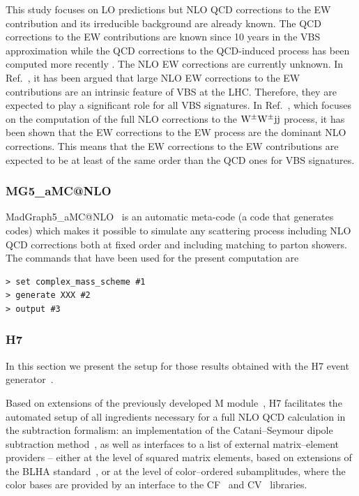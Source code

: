 \documentclass[11pt]{cernrep}
\makeatletter
\newcommand{\Herwig}{H\protect\scalebox{0.8}{ERWIG}7\xspace}
\newcommand{\Matchbox}{M\protect\scalebox{0.8}{ATCHBOX}\xspace}
\newcommand{\MGaMC}{M\protect\scalebox{0.8}{AD}G\protect\scalebox{0.8}{RAPH}5\_aMC@NLO\xspace}
\newcommand{\CVolver}{CV\protect\scalebox{0.8}{OLVER}\xspace}
\newcommand{\ColorFull}{C\protect\scalebox{0.8}{OLOR}F\protect\scalebox{0.8}{ULL}\xspace}
\newcommand{\MP}[1]{{ {\color{blue}{ [MP: #1]}} }}
\makeatother
\begin{document}
This study focuses on LO predictions but NLO QCD corrections to the EW contribution and its irreducible background are already known.
The QCD corrections to the EW contributions are known since 10 years in the VBS approximation \cite{Bozzi:2007ur} while the QCD corrections to the QCD-induced process has been computed more recently \cite{Campanario:2013qba}.
The NLO EW corrections are currently unknown.
In Ref.~\cite{Biedermann:2016yds}, it has been argued that large NLO EW corrections to the EW contributions are an intrinsic feature of VBS at the LHC.
Therefore, they are expected to play a significant role for all VBS signatures.
In Ref.~\cite{Biedermann:2017bss}, which focuses on the computation of the full NLO corrections to the ${\rm W}^\pm{\rm W}^\pm{\rm j}{\rm j}$ process, it has been shown that the EW corrections to the EW process are the dominant NLO corrections.
This means that the EW corrections to the EW contributions are expected to be at least of the same order than the QCD ones for VBS signatures.
\MP{Add some comments on parton shower effects that can play a significant role.}

\subsubsection*{\protect\MGaMC \label{vbs_mgamc}}

{\sc MadGraph5\_aMC@NLO}~\cite{Alwall:2014hca} is an automatic meta-code (a code that generates codes) which makes it possible to simulate any scattering process
      including NLO QCD corrections both at fixed order and including matching to parton showers. 
      The commands that have been used for the present computation are
\begin{verbatim}
> set complex_mass_scheme #1
> generate XXX #2
> output #3
\end{verbatim}
  
  
\subsubsection*{\protect\Herwig \label{vbs_herwig}}
\MP{This subsubsection is out-dated I think. Isn't it?}

In this section we present the setup for those results obtained with the
\Herwig event generator~\cite{Bellm:2015jjp,Bahr:2008pv}.

Based on extensions of the previously developed \Matchbox
module~\cite{Platzer:2011bc}, \Herwig facilitates the automated setup of all
ingredients necessary for a full NLO QCD calculation in the subtraction
formalism: an implementation of the Catani--Seymour dipole subtraction
method~\cite{Catani:1996vz,Catani:2002hc}, as well as interfaces to a list of
external matrix--element providers -- either at the level of squared matrix
elements, based on extensions of the BLHA
standard~\cite{Binoth:2010xt,Alioli:2013nda,Andersen:2014efa}, or at the
level of color--ordered subamplitudes, where the color bases are provided by
an interface to the \ColorFull~\cite{Sjodahl:2014opa} and
\CVolver~\cite{Platzer:2013fha} libraries.
\end{document}
